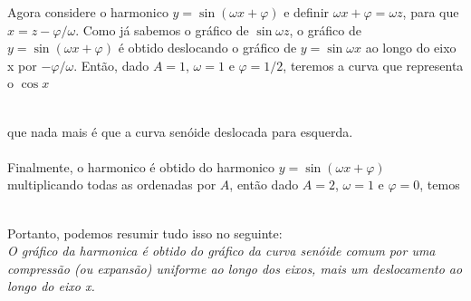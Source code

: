 Agora considere o harmonico $y = \sin{(\omega x + \varphi)}$ e definir $\omega x + \varphi = \omega z$,
para que $x = z - \varphi/\omega$. Como já sabemos o gráfico de $\sin{\omega z}$, o gráfico 
de $y = \sin{(\omega x + \varphi)}$ é obtido deslocando o gráfico de $y = \sin{\omega x}$ ao
longo do eixo x por $-\varphi/\omega$. Então, dado $A = 1$, $\omega = 1$ e $\varphi = 1/2$,
teremos a curva que representa o $\cos{x}$\\
\\
que nada mais é que a curva senóide deslocada para esquerda.\\
\\
Finalmente, o harmonico \senoide é obtido do harmonico $y = \sin{(\omega x + \varphi)}$
multiplicando todas as ordenadas por $A$, então dado $A = 2$, $\omega = 1$ e $\varphi = 0$,
temos\\
\\
Portanto, podemos resumir tudo isso no seguinte:\\
\textit{ O gráfico da harmonica \senoide é obtido do gráfico da curva
senóide comum por uma compressão (ou expansão) uniforme ao longo dos eixos,
mais um deslocamento ao longo do eixo x.}\\
